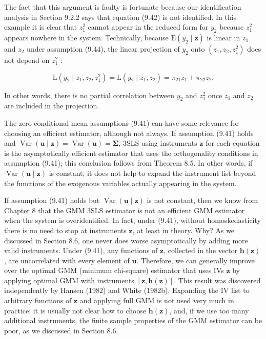 \documentclass[10pt]{article}
\begin{document}
The fact that this argument is faulty is fortunate because our identification analysis in Section 9.2.2 says that equation (9.42) is not identified. In this example it is clear that $z_{1}^{2}$ cannot appear in the reduced form for $y_{2}$ because $z_{1}^{2}$ appears nowhere in the system. Technically, because $\mathrm{E}\left(y_{2} \mid \mathbf{z}\right)$ is linear in $z_{1}$ and $z_{2}$ under assumption (9.44), the linear projection of $y_{2}$ onto $\left(z_{1}, z_{2}, z_{1}^{2}\right)$ does not depend on $z_{1}^{2}$ :


\begin{equation*}
\mathrm{L}\left(y_{2} \mid z_{1}, z_{2}, z_{1}^{2}\right)=\mathrm{L}\left(y_{2} \mid z_{1}, z_{2}\right)=\pi_{21} z_{1}+\pi_{22} z_{2} . \tag{9.45}
\end{equation*}


In other words, there is no partial correlation between $y_{2}$ and $z_{1}^{2}$ once $z_{1}$ and $z_{2}$ are included in the projection.

The zero conditional mean assumptions (9.41) can have some relevance for choosing an efficient estimator, although not always. If assumption (9.41) holds and $\operatorname{Var}(\mathbf{u} \mid \mathbf{z})=\operatorname{Var}(\mathbf{u})=\mathbf{\Sigma}$, 3SLS using instruments $\mathbf{z}$ for each equation is the asymptotically efficient estimator that uses the orthogonality conditions in assumption (9.41); this conclusion follows from Theorem 8.5. In other words, if $\operatorname{Var}(\mathbf{u} \mid \mathbf{z})$ is constant, it does not help to expand the instrument list beyond the functions of the exogenous variables actually appearing in the system.

If assumption (9.41) holds but $\operatorname{Var}(\mathbf{u} \mid \mathbf{z})$ is not constant, then we know from Chapter 8 that the GMM 3SLS estimator is not an efficient GMM estimator when the system is overidentified. In fact, under (9.41), without homoskedasticity there is no need to stop at instruments $\mathbf{z}$, at least in theory. Why? As we discussed in Section 8.6, one never does worse asymptotically by adding more valid instruments. Under (9.41), any functions of $\mathbf{z}$, collected in the vector $\mathbf{h}(\mathbf{z})$, are uncorrelated with every element of $\mathbf{u}$. Therefore, we can generally improve over the optimal GMM (minimum chi-square) estimator that uses IVs $\mathbf{z}$ by applying optimal GMM with instruments $[\mathbf{z}, \mathbf{h}(\mathbf{z})]$. This result was discovered independently by Hansen (1982) and White (1982b). Expanding the IV list to arbitrary functions of $\mathbf{z}$ and applying full GMM is not used very much in practice: it is usually not clear how to choose $\mathbf{h}(\mathbf{z})$, and, if we use too many additional instruments, the finite sample properties of the GMM estimator can be poor, as we discussed in Section 8.6.
\end{document}
